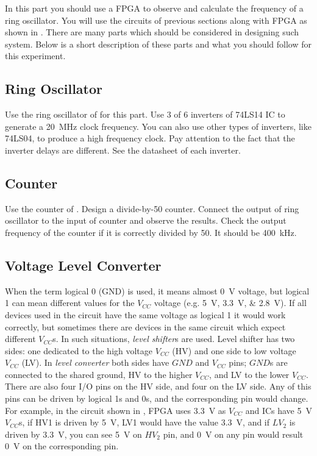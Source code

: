 \documentclass[12pt, logo=tehranDLDL/ut]{tehranDLDL}
\begin{document}
In this part you should use a FPGA to observe and calculate the frequency of a ring oscillator. You will use the circuits of previous sections along with FPGA as shown in . There are many parts which should be considered in designing such system. Below is a short description of these parts and what you should follow for this experiment.

\subsection{Ring Oscillator}

Use the ring oscillator of  for this part. Use 3 of 6 inverters of 74LS14 IC to generate a \SI{20}{\mega\hertz} clock frequency. You can also use other types of inverters, like 74LS04, to produce a high frequency clock. Pay attention to the fact  that the inverter delays are different. See the datasheet of each inverter.

\subsection{Counter}

Use the counter of . Design a divide-by-50 counter. Connect the output of ring oscillator to the input of counter and observe the results. Check the output frequency of the counter if it is correctly divided by 50. It should be \SI{400}{\kilo\hertz}.

\subsection{Voltage Level Converter}

When the term logical 0 (GND) is used, it means almost \SI{0}{\volt} voltage, but logical 1 can mean different values for the $V_\mathit{CC}$ voltage (e.g. \SIlist{5; 3.3; 2.8}{\volt}). If all devices used in the circuit have the same voltage as logical 1 it would work correctly, but sometimes there are devices in the same circuit which expect different $V_\mathit{CC}$s. In such situations, \textit{level shifter}s are used. Level shifter has two sides: one dedicated to the high voltage $V_\mathit{CC}$ (HV) and one side to low voltage $V_\mathit{CC}$ (LV). In \textit{level converter} both sides have $\mathit{GND}$ and $V_\mathit{CC}$ pins; $\mathit{GND}$s are connected to the shared ground, HV to the higher $V_\mathit{CC}$, and LV to the lower $V_\mathit{CC}$. There are also four I/O pins on the HV side, and four on the LV side. Any of this pins can be driven by logical 1s and 0s, and the corresponding pin would change. For example, in the circuit shown in , FPGA uses \SI{3.3}{\volt} as $V_\mathit{CC}$ and ICs have \SI{5}{\volt} $V_\mathit{CC}$s, if HV1 is driven by \SI{5}{\volt}, LV1 would have the value \SI{3.3}{\volt}, and if $LV_2$ is driven by \SI{3.3}{\volt}, you can see \SI{5}{\volt} on $HV_2$ pin, and \SI{0}{\volt} on any pin would result \SI{0}{\volt} on the corresponding pin.
\end{document}
